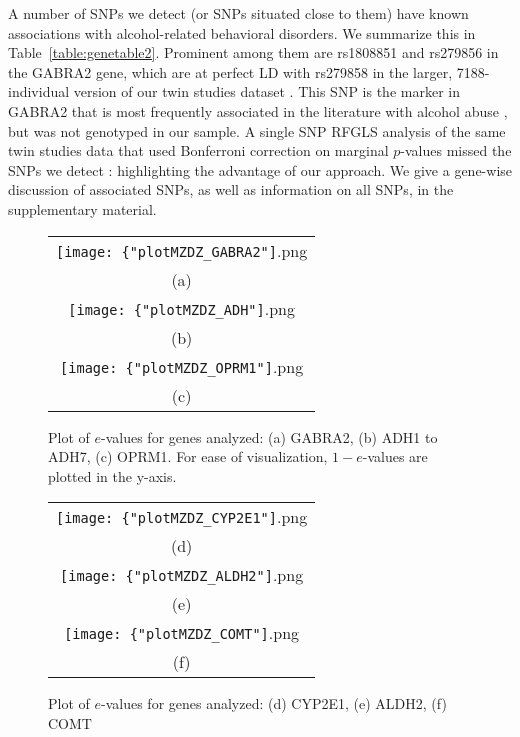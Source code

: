 A number of SNPs we detect (or SNPs situated close to them) have known associations with alcohol-related behavioral disorders. We summarize this in Table~\ref{table:genetable2}. Prominent among them are rs1808851 and rs279856 in the GABRA2 gene, which are at perfect LD with rs279858 in the larger, 7188-individual version of our twin studies dataset \citep{IronsThesis12}. This SNP is the marker in GABRA2 that is most frequently associated in the literature with alcohol abuse \citep{CuiEtal12}, but was not genotyped in our sample. A single SNP RFGLS analysis of the same twin studies data that used Bonferroni correction on marginal $p$-values missed the SNPs we detect \citep{IronsThesis12}: highlighting the advantage of our approach. We give a gene-wise discussion of associated SNPs, as well as information on all SNPs, in the supplementary material.

\begin{figure}
\begin{center}

\begin{tabular}{c}
		\texttt{[image: \{"plotMZDZ\_GABRA2"]}.png}\\
		(a)\\
		\texttt{[image: \{"plotMZDZ\_ADH"]}.png} \\
		(b)\\	
		\texttt{[image: \{"plotMZDZ\_OPRM1"]}.png}\\
		(c)\\	
\end{tabular}

\caption{Plot of $e$-values for genes analyzed: (a) GABRA2, (b) ADH1 to ADH7, (c) OPRM1. For ease of visualization, $1 - e$-values are plotted in the y-axis.}
\label{fig:geneplot1}

\end{center}
\end{figure}

\begin{figure}
\begin{center}

\begin{tabular}{c}
		\texttt{[image: \{"plotMZDZ\_CYP2E1"]}.png}\\
		(d)\\
		\texttt{[image: \{"plotMZDZ\_ALDH2"]}.png} \\
		(e)\\	
		\texttt{[image: \{"plotMZDZ\_COMT"]}.png}\\
		(f)\\	
\end{tabular}

\caption{Plot of $e$-values for genes analyzed: (d) CYP2E1, (e) ALDH2, (f) COMT}
\label{fig:geneplot2}

\end{center}
\end{figure}

